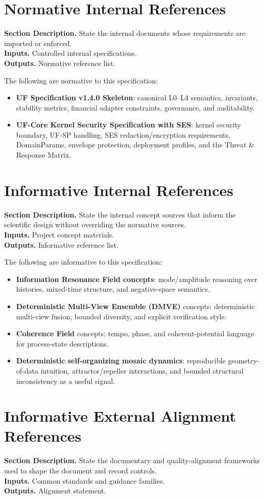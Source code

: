 \documentclass[11pt]{report}
\newcommand{\meta}[3]{\textbf{Section Description.} #1\\
\textbf{Inputs.} #2\\
\textbf{Outputs.} #3\par}
\begin{document}
\section{Normative Internal References}
\meta{State the internal documents whose requirements are imported or enforced.}{Controlled internal specifications.}{Normative reference list.}

The following are normative to this specification:
\begin{itemize}
    \item \textbf{UF Specification v1.4.0 Skeleton}: canonical L0--L4 semantics, invariants, stability metrics, financial adapter constraints, governance, and auditability.
    \item \textbf{UF-Core Kernel Security Specification with SES}: kernel security boundary, UF-SP handling, SES redaction/encryption requirements, DomainParams, envelope protection, deployment profiles, and the Threat \& Response Matrix.
\end{itemize}

\section{Informative Internal References}
\meta{State the internal concept sources that inform the scientific design without overriding the normative sources.}{Project concept materials.}{Informative reference list.}

The following are informative to this specification:
\begin{itemize}
    \item \textbf{Information Resonance Field concepts}: mode/amplitude reasoning over histories, mixed-time structure, and negative-space semantics.
    \item \textbf{Deterministic Multi-View Ensemble (DMVE)} concepts: deterministic multi-view fusion, bounded diversity, and explicit verification style.
    \item \textbf{Coherence Field} concepts: tempo, phase, and coherent-potential language for process-state descriptions.
    \item \textbf{Deterministic self-organizing mosaic dynamics}: reproducible geometry-of-data intuition, attractor/repeller interactions, and bounded structural inconsistency as a useful signal.
\end{itemize}

\section{Informative External Alignment References}
\meta{State the documentary and quality-alignment frameworks used to shape the document and record controls.}{Common standards and guidance families.}{Alignment statement.}
\end{document}
